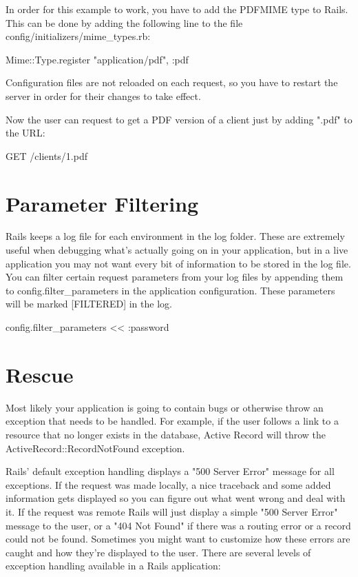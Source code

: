 \documentclass[10pt]{book}
\newenvironment{code}{%
  \scriptsize
    \verbatim
}{%
    \endverbatim
    \newline
}
\begin{document}
In order for this example to work, you have to add the PDFMIME type to Rails. This can be done by adding the following line to the file config/initializers/mime\_types.rb:
\begin{code}
Mime::Type.register "application/pdf", :pdf
\end{code}

Configuration files are not reloaded on each  request, so you have to restart the server in order for their changes to  take effect.

Now the user can request to get a PDF version of a client just by adding ".pdf" to the URL:
\begin{code}
GET /clients/1.pdf
\end{code}

\section{ Parameter Filtering}

Rails keeps a log file for each environment in the log  folder. These are extremely useful when debugging what’s actually going  on in your application, but in a live application you may not want every  bit of information to be stored in the log file. You can filter certain  request parameters from your log files by appending them to config.filter\_parameters in the application configuration. These parameters will be marked [FILTERED] in the log.
\begin{code}
config.filter_parameters << :password
\end{code}

\section{ Rescue}

Most likely your application is going to contain bugs or otherwise  throw an exception that needs to be handled. For example, if the user  follows a link to a resource that no longer exists in the database,  Active Record will throw the ActiveRecord::RecordNotFound exception.

Rails’ default exception handling displays a "500 Server Error"  message for all exceptions. If the request was made locally, a nice  traceback and some added information gets displayed so you can figure  out what went wrong and deal with it. If the request was remote Rails  will just display a simple "500 Server Error" message to the user, or a  "404 Not Found" if there was a routing error or a record could not be  found. Sometimes you might want to customize how these errors are caught  and how they’re displayed to the user. There are several levels of  exception handling available in a Rails application:
\end{document}
